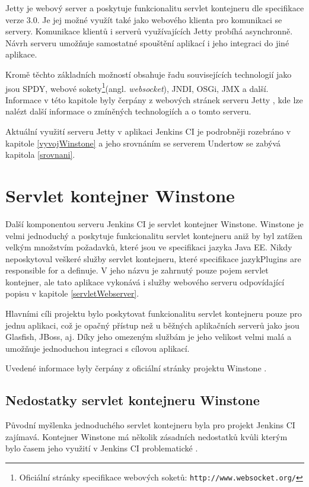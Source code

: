         Jetty je webový server a poskytuje funkcionalitu servlet kontejneru dle specifikace verze 3.0. 
        Je jej možné využít také jako webového klienta pro komunikaci se servery. Komunikace
        klientů i serverů využívajících Jetty probíhá asynchronně. 
        Návrh serveru umožňuje samostatné spouštění aplikací i jeho integraci do jiné aplikace. 

        Kromě těchto základních možností obsahuje
        řadu souvisejících technologií jako jsou SPDY, webové sokety\footnote{Oficiální stránky 
            specifikace webových soketů: \texttt{http://www.websocket.org/}}(angl. \emph{websocket}),
        JNDI, OSGi, JMX a další. 
        Informace v této kapitole byly čerpány z webových stránek serveru Jetty \cite{jettyWeb}, kde lze nalézt 
        další informace o zmíněných technologiích a o tomto serveru.
        
        Aktuální využití serveru Jetty v aplikaci Jenkins CI je podrobněji rozebráno
        v kapitole \ref{vyvojWinstone} a jeho srovnáním se serverem Undertow se 
        zabývá kapitola \ref{srovnani}.
        

    \section{Servlet kontejner Winstone} \label{winstone}
        Další komponentou serveru Jenkins CI je servlet kontejner Winstone.
        Winstone je velmi jednoduchý a poskytuje funkcionalitu
        servlet kontejneru aniž by byl zatížen velkým množstvím požadavků, které jsou ve specifikaci jazyka Java EE.
        Nikdy neposkytoval veškeré služby servlet kontejneru, které specifikace jazykPlugins are responsible for a definuje. 
        V jeho názvu je zahrnutý pouze pojem servlet kontejner, ale tato aplikace vykonává i služby
        webového serveru odpovídající popisu v kapitole \ref{servletWebserver}.

        Hlavními cíli projektu bylo poskytovat funkcionalitu servlet kontejneru pouze pro jednu aplikaci,
        což je opačný přístup než u běžných aplikačních serverů jako jsou Glasfish, JBoss, aj.
        Díky jeho omezeným službám je jeho velikost velmi malá a umožňuje jednoduchou integraci s
        cílovou aplikací.

        Uvedené informace byly čerpány z oficiální stránky projektu Winstone \cite{winstoneWeb}.

        \subsection{Nedostatky servlet kontejneru Winstone}
            Původní myšlenka jednoduchého servlet kontejneru byla pro projekt Jenkins CI zajímavá.
            Kontejner Winstone má několik zásadních nedostatků kvůli kterým bylo časem jeho využití v 
            Jenkins CI problematické \cite{kohsukeTopic}. 

